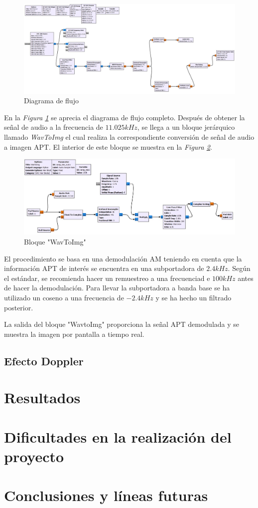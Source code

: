 \documentclass[a4paper,11pt]{article}
\begin{document}
	\begin{figure}[hbtp]
 \centering
 \includegraphics[width = 17cm]{imagenes/diagrama_flujo_completo.JPG}
 \caption{Diagrama de flujo}
 \label{diagrama_completo}
 \end{figure}
 
 En la \textit{Figura \ref{diagrama_completo}} se aprecia el diagrama de flujo completo. Después de obtener la señal de audio a la frecuencia de $11.025 kHz$, se llega a un bloque jerárquico llamado \textit{WavToImg} el cual realiza la correspondiente conversión de señal de audio a imagen APT. El interior de este bloque se muestra en la \textit{Figura \ref{wavtoimage}}.
 
 \begin{figure}[hbtp]
 \centering
 \includegraphics[width = 17cm]{imagenes/APT_hier.JPG}
 \caption{Bloque "WavToImg"}
 \label{wavtoimage}
 \end{figure}

El procedimiento se basa en una demodulación AM teniendo en cuenta que la información APT de interés se encuentra en una subportadora de $2.4 kHz$. 
	Según el estándar, se recomienda hacer un remuestreo a una frecuenciad e $100 kHz$ antes de hacer la demodulación. Para llevar la subportadora a banda base se ha utilizado un coseno a una frecuencia de $-2.4 kHz$ y se ha hecho un filtrado posterior.
	
La salida del bloque "WavtoImg" proporciona la señal APT demodulada y se muestra la imagen por pantalla a tiempo real.



	\subsection{Efecto Doppler}

\section{Resultados}

\section{Dificultades en la realización del proyecto}

\section{Conclusiones y líneas futuras}
 
\end{document}
